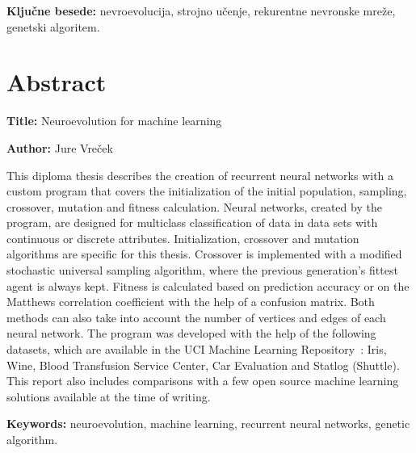 \documentclass[a4paper,12pt,openright]{book}
\newcommand{\ttitleEn}{Neuroevolution for machine learning}
\newcommand{\tauthor}{Jure Vreček}
\newcommand{\tkeywords}{nevroevolucija, strojno učenje, rekurentne nevronske mreže, genetski algoritem}
\newcommand{\tkeywordsEn}{neuroevolution, machine learning, recurrent neural networks, genetic algorithm}
\newcommand{\clearemptydoublepage}{\newpage{\pagestyle{empty}\cleardoublepage}}
\begin{document}
    \bigskip

    \noindent\textbf{Ključne besede:} \tkeywords.
    \clearemptydoublepage

    \chapter*{Abstract}

    \noindent\textbf{Title:} \ttitleEn
    \bigskip

    \noindent\textbf{Author:} \tauthor
    \bigskip

    \noindent This diploma thesis describes the creation of recurrent neural networks with a custom program that covers the
    initialization of the initial population, sampling, crossover, mutation and fitness calculation.
    Neural networks, created by the program, are designed for multiclass classification of data in data sets with continuous or discrete attributes.
    Initialization, crossover and mutation algorithms are specific for this thesis.
    Crossover is implemented with a modified stochastic universal sampling algorithm, where the previous generation's fittest agent is always kept.
    Fitness is calculated based on prediction accuracy or on the Matthews correlation coefficient with the help of a confusion matrix.
    Both methods can also take into account the number of vertices and edges of each neural network.
    The program was developed with the help of the following datasets, which are available in the UCI Machine Learning Repository~\cite{Dua:2019}:
    Iris, Wine, Blood Transfusion Service Center, Car Evaluation and Statlog (Shuttle).
    This report also includes comparisons with a few open source machine learning solutions available at the time of writing.
    \bigskip

    \noindent\textbf{Keywords:} \tkeywordsEn.
    \clearemptydoublepage

    \mainmatter
    \setcounter{page}{1}
    \pagestyle{fancy}
\end{document}
